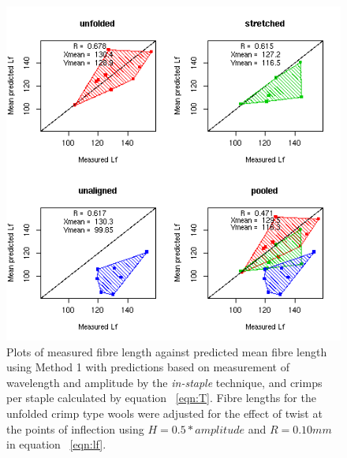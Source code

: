 %

\begin{figure}[!h]
  \centering
  \includegraphics[width=1.1\textwidth]{figispredlftc.png}
  \caption{Plots of measured fibre length against predicted mean fibre length using Method 1 with predictions based on measurement of wavelength and amplitude by the {\em in-staple} technique, and crimps per staple calculated by equation ~\ref{eqn:T}. Fibre lengths for the unfolded crimp type wools were adjusted for the effect of twist at the points of inflection using $H = 0.5 * amplitude$ and $R = 0.10 mm$ in equation ~\ref{eqn:lf}.}
  \label{fig:ispredlftc}
\end{figure}

%

